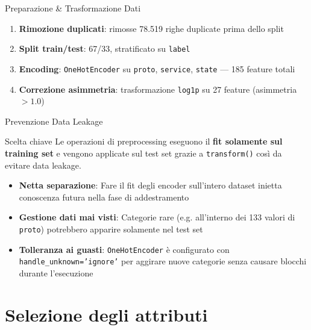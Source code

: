 \documentclass{beamer}
\begin{document}
\begin{frame}{Preparazione \& Trasformazione Dati}
  \begin{enumerate}
    \item \textbf{Rimozione duplicati}: rimosse 78.519 righe duplicate prima dello split
    \item \textbf{Split train/test}: 67/33, stratificato su \texttt{label}
    \item \textbf{Encoding}: \texttt{OneHotEncoder} su \texttt{proto},
      \texttt{service}, \texttt{state} — 185 feature totali
    \item \textbf{Correzione asimmetria}: trasformazione \texttt{log1p} su 27 feature (asimmetria $> 1.0$)
  \end{enumerate}
\end{frame}

\begin{frame}{Prevenzione Data Leakage}
  \begin{alertblock}{Scelta chiave}
    Le operazioni di preprocessing eseguono il \textbf{fit solamente sul training set} e vengono applicate sul test set grazie a \texttt{transform()} così da evitare data leakage.
  \end{alertblock}
  \vspace{0.3cm}
  \begin{itemize}
    \item \textbf{Netta separazione}: Fare il fit degli encoder sull'intero dataset  inietta conoscenza futura nella fase di addestramento
    \item \textbf{Gestione dati mai visti}: Categorie rare (e.g. all'interno dei 133 valori di \texttt{proto}) potrebbero apparire solamente nel test set
    \item \textbf{Tolleranza ai guasti}: \texttt{OneHotEncoder} è configurato con \texttt{handle\_unknown='ignore'} per aggirare nuove categorie senza causare blocchi durante l'esecuzione
  \end{itemize}
\end{frame}

\section{Selezione degli attributi}
\end{document}
